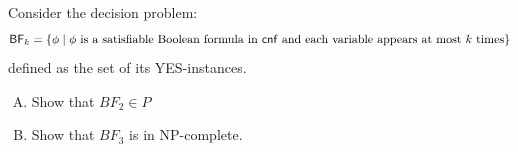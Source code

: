 \documentclass{cs0500}
\begin{document}
\maketitle
\begin{problem}
Consider the decision problem:
\begin{equation*}
    \textsf{BF}_k = \{\phi \mid \phi \text{ is a satisfiable Boolean formula in \textsf{cnf} and each variable appears at most $k$ times}\}
\end{equation*}
defined as the set of its YES-instances.
\begin{enumerate}[(A)]
    \item Show that $BF_2\in P$
    \item Show that $BF_{3}$ is in \textsf{NP}-complete.
\end{enumerate}
\end{problem}
\begin{solution}
\end{solution}

\newpage
\end{document}
